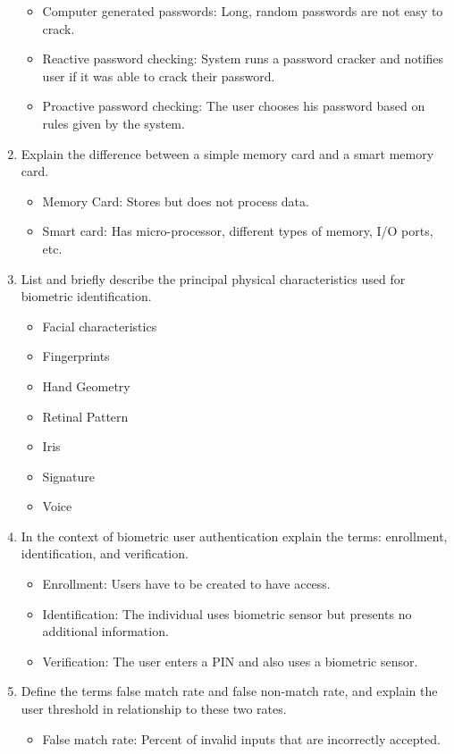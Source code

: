 \documentclass[12pt]{article}
\begin{document}
\begin{enumerate}[label=Q3.\arabic*]
\begin{itemize}
				\item Computer generated passwords: Long, random passwords are not easy to crack.
				\item Reactive password checking: System runs a password cracker and notifies user if it was able to crack their password.
				\item Proactive password checking: The user chooses his password based on rules given by the system.
			\end{itemize}
		\item Explain the difference between a simple memory card and a smart memory card.
			\begin{itemize}
				\item Memory Card: Stores but does not process data.
				\item Smart card: Has micro-processor, different types of memory, I/O ports, etc.
			\end{itemize}
		\item List and briefly describe the principal physical characteristics used for biometric identification.
			\begin{itemize}
				\item Facial characteristics
				\item Fingerprints
				\item Hand Geometry
				\item Retinal Pattern
				\item Iris
				\item Signature
				\item Voice
			\end{itemize}
		\item In the context of biometric user authentication explain the terms: enrollment, identification, and verification.
			\begin{itemize}
				\item Enrollment: Users have to be created to have access.
				\item Identification: The individual uses biometric sensor but presents no additional information.
				\item Verification: The user enters a PIN and also uses a biometric sensor.
			\end{itemize}
		\item Define the terms false match rate and false non-match rate, and explain the user threshold in relationship to these two rates.
			\begin{itemize}
				\item False match rate: Percent of invalid inputs that are incorrectly accepted.

\end{itemize}
\end{enumerate}
\end{document}
